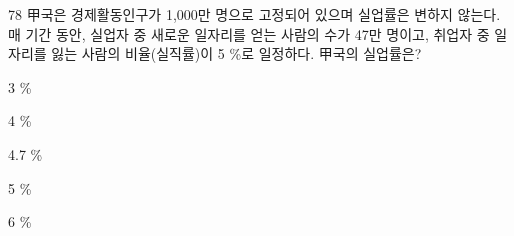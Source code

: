 \begin{question}{78}
甲국은 경제활동인구가 1,000만 명으로 고정되어 있으며 실업률은 변하지 않는다. 매 기간 동안, 실업자 중 새로운 일자리를 얻는 사람의 수가 47만 명이고, 취업자 중 일자리를 잃는 사람의 비율(실직률)이 5 \%로 일정하다. 甲국의 실업률은?
\begin{choices}
  \item 3 \%
  \item 4 \%
  \item 4.7 \%
  \item 5 \%
  \item 6 \%
\end{choices}
\end{question}
